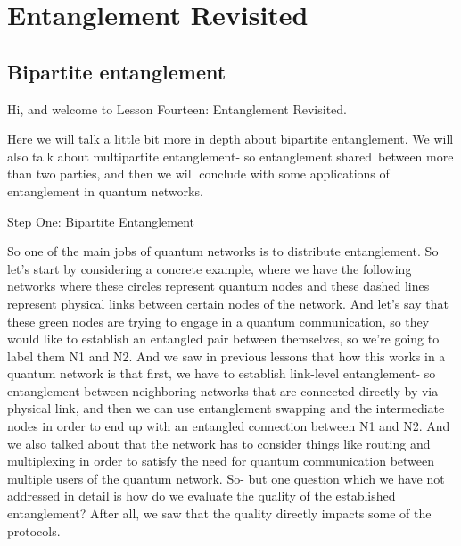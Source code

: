\chapter{Entanglement Revisited}

\section{Bipartite entanglement}

Hi, and welcome to Lesson Fourteen: Entanglement Revisited.

Here we will talk a little bit more in depth about bipartite entanglement. We will also talk about multipartite entanglement- so entanglement shared between more than two parties, and then we will conclude with some applications of entanglement in quantum networks.

Step One: Bipartite Entanglement

So one of the main jobs of quantum networks is to distribute entanglement. So let's start by considering a concrete example, where we have the following networks where these circles represent quantum nodes and these dashed lines represent physical links between certain nodes of the network. And let's say that these green nodes are trying to engage in a quantum communication, so they would like to establish an entangled pair between themselves, so we're going to label them N1 and N2. And we saw in previous lessons that how this works in a quantum network is that first, we have to establish link-level entanglement- so entanglement between neighboring networks that are connected directly by via physical link, and then we can use entanglement swapping and the intermediate nodes in order to end up with an entangled connection between N1 and N2. And we also talked about that the network has to consider things like routing and multiplexing in order to satisfy the need for quantum communication between multiple users of the quantum network. So- but one question which we have not addressed in detail is how do we evaluate the quality of the established entanglement? After all, we saw that the quality directly impacts some of the protocols.

